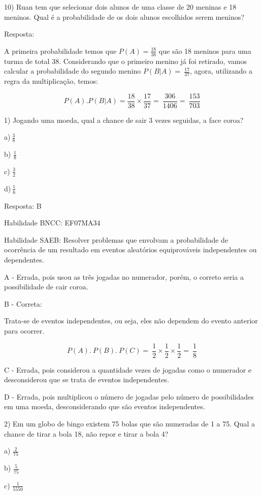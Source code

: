 10) Ruan tem que selecionar dois alunos de uma classe de 20 meninas e 18
meninos. Qual é a probabilidade de os dois alunos escolhidos serem
meninos?

Resposta:

A primeira probabilidade temos que \(P(A) = \frac{18}{38}\) que são 18
meninos para uma turma de total 38. Considerando que o primeiro menino
já foi retirado, vamos calcular a probabilidade do segundo menino
\(P(B|A) = \ \frac{17}{37}\), agora, utilizando a regra da
multiplicação, temos:

\[P(A).P(B|A) = \frac{18}{38} \times \frac{17}{37} = \ \frac{306}{1406} = \ \frac{153}{703}\]


1) Jogando uma moeda, qual a chance de sair 3 vezes seguidas, a face
coroa?

a)\(\ \frac{3}{8}\)

b) \(\frac{1}{8}\)

c) \(\frac{3}{2}\)

d)\(\ \frac{1}{6}\)

Resposta: B

Habilidade BNCC: EF07MA34

Habilidade SAEB: Resolver problemas que envolvam a probabilidade de
ocorrência de um resultado em eventos aleatórios equiprováveis
independentes ou dependentes.

A - Errada, pois usou as três jogadas no numerador, porém, o correto
seria a possibilidade de cair coroa.

B - Correta:

Trata-se de eventos independentes, ou seja, eles não dependem do evento
anterior para ocorrer.

\[P(A).\ P(B).\ P(C) = \ \frac{1}{2} \times \frac{1}{2} \times \frac{1}{2} = \ \frac{1}{8}\]

C - Errada, pois considerou a quantidade vezes de jogadas como o
numerador e desconsiderou que se trata de eventos independentes.

D - Errada, pois multiplicou o número de jogadas pelo número de
possibilidades em uma moeda, desconsiderando que são eventos
independentes.

2) Em um globo de bingo existem 75 bolas que são numeradas de 1 a 75.
Qual a chance de tirar a bola 18, não repor e tirar a bola 4?

a) \(\frac{2}{75}\)

b) \(\frac{5}{75}\)

c) \(\frac{1}{5550}\)

